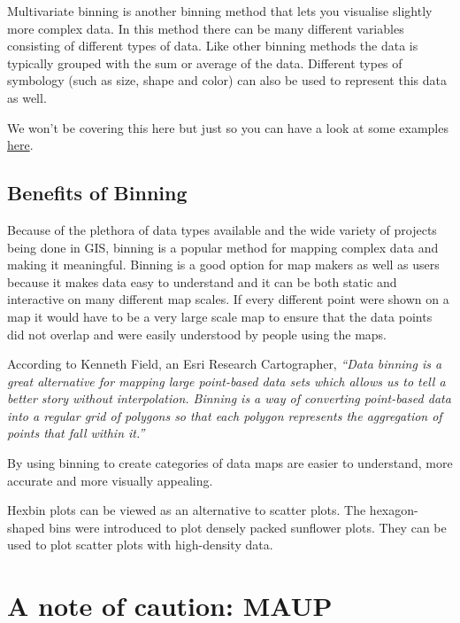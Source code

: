 \documentclass[]{book}
\begin{document}
Multivariate binning is another binning method that lets you visualise slightly more complex data. In this method there can be many different variables consisting of different types of data. Like other binning methods the data is typically grouped with the sum or average of the data. Different types of symbology (such as size, shape and color) can also be used to represent this data as well.

We won't be covering this here but just so you can have a look at some examples \href{https://mgimond.github.io/Spatial/data-manipulation-in-r.html}{here}.

\hypertarget{benefits-of-binning}{%
\subsection{Benefits of Binning}\label{benefits-of-binning}}

Because of the plethora of data types available and the wide variety of projects being done in GIS, binning is a popular method for mapping complex data and making it meaningful. Binning is a good option for map makers as well as users because it makes data easy to understand and it can be both static and interactive on many different map scales. If every different point were shown on a map it would have to be a very large scale map to ensure that the data points did not overlap and were easily understood by people using the maps.

According to Kenneth Field, an Esri Research Cartographer, \emph{``Data binning is a great alternative for mapping large point-based data sets which allows us to tell a better story without interpolation. Binning is a way of converting point-based data into a regular grid of polygons so that each polygon represents the aggregation of points that fall within it.''}

By using binning to create categories of data maps are easier to understand, more accurate and more visually appealing.

Hexbin plots can be viewed as an alternative to scatter plots. The hexagon-shaped bins were introduced to plot densely packed sunflower plots. They can be used to plot scatter plots with high-density data.

\hypertarget{a-note-of-caution-maup}{%
\section{A note of caution: MAUP}\label{a-note-of-caution-maup}}
\end{document}
